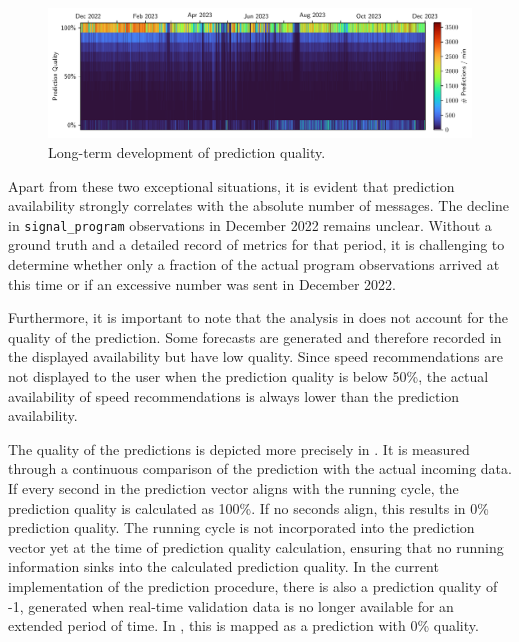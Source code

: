 \begin{figure}[t]
    \centering
    \includegraphics[width=\linewidth]{images/monitoring-long-term-study.pdf}
    \caption{Long-term development of prediction quality.}\label{fig:monitoring-long-term-study}
\end{figure}

Apart from these two exceptional situations, it is evident that prediction availability strongly correlates with the absolute number of messages. The decline in \texttt{signal\_program} observations in December 2022 remains unclear. Without a ground truth and a detailed record of metrics for that period, it is challenging to determine whether only a fraction of the actual program observations arrived at this time or if an excessive number was sent in December 2022.

Furthermore, it is important to note that the analysis in  does not account for the quality of the prediction. Some forecasts are generated and therefore recorded in the displayed availability but have low quality. Since speed recommendations are not displayed to the user when the prediction quality is below 50\%, the actual availability of speed recommendations is always lower than the prediction availability.

The quality of the predictions is depicted more precisely in . It is measured through a continuous comparison of the prediction with the actual incoming data. If every second in the prediction vector aligns with the running cycle, the prediction quality is calculated as 100\%. If no seconds align, this results in 0\% prediction quality. The running cycle is not incorporated into the prediction vector yet at the time of prediction quality calculation, ensuring that no running information sinks into the calculated prediction quality. In the current implementation of the prediction procedure, there is also a prediction quality of -1, generated when real-time validation data is no longer available for an extended period of time. In , this is mapped as a prediction with 0\% quality.

